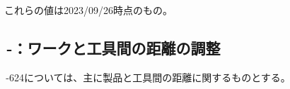 \begin{hosoku}
これらの値は2023/09/26時点のもの。
\end{hosoku}



\clearpage

\subsection{\,-：ワークと工具間の距離の調整}
\,-\ttNum624については、主に製品と工具間の距離に関するものとする。\\

